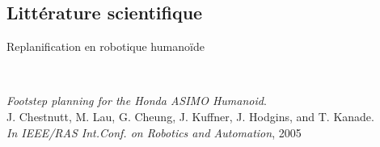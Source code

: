 \documentclass{beamer}
\begin{document}
\subsection*{Littérature scientifique}
\begin{frame}
  \center Replanification en robotique humanoïde
  \begin{figure}
    ~
    \\
  \end{figure}

  \begin{small}
    \emph{Footstep planning for the Honda ASIMO Humanoid}.\\
    J. Chestnutt, M. Lau, G. Cheung, J. Kuffner, J. Hodgins, and T. Kanade.\\
    \textit{In IEEE/RAS Int.Conf. on Robotics and Automation}, 2005
  \end{small}

\end{frame}
\end{document}
